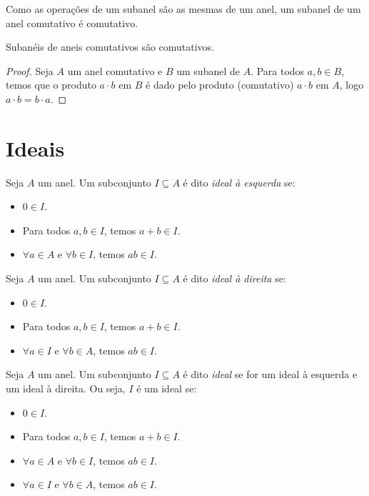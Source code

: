 Como as operações de um subanel são as mesmas de um anel, um subanel de um anel comutativo é comutativo.

\begin{prop}
    Subanéis de aneis comutativos são comutativos.
\end{prop}
\begin{proof}
Seja $A$ um anel comutativo e $B$ um subanel de $A$. Para todos $a, b \in B$, temos que o produto $a\cdot b$ em $B$ é dado pelo produto (comutativo) $a\cdot b$ em $A$, logo $a\cdot b=b\cdot a$.
\end{proof}
\section{Ideais}
\begin{definition}
    Seja $A$ um anel. Um subconjunto $I \subseteq A$ é dito \emph{ideal à esquerda} se:
    \begin{itemize}
        \item $0 \in I$.
        \item Para todos $a, b \in I$, temos $a+b\in I$.
        \item $\forall a \in A$ e $\forall b \in I$, temos $ab \in I$.
    \end{itemize}
\end{definition}

\begin{definition}
    Seja $A$ um anel. Um subconjunto $I \subseteq A$ é dito \emph{ideal à direita} se:
    \begin{itemize}
        \item $0 \in I$.
        \item Para todos $a, b \in I$, temos $a+b\in I$.
        \item $\forall a \in I$ e $\forall b \in A$, temos $ab \in I$.
    \end{itemize}
\end{definition}

\begin{definition}[Ideal]
    Seja $A$ um anel. Um subconjunto $I \subseteq A$ é dito \emph{ideal} se for um ideal à esquerda e um ideal à direita. Ou seja, $I$ é um ideal se:
    \begin{itemize}
        \item $0 \in I$.
        \item Para todos $a, b \in I$, temos $a+b\in I$.
        \item $\forall a \in A$ e $\forall b \in I$, temos $ab \in I$.
        \item $\forall a \in I$ e $\forall b \in A$, temos $ab \in I$.

    \end{itemize}
\end{definition}

